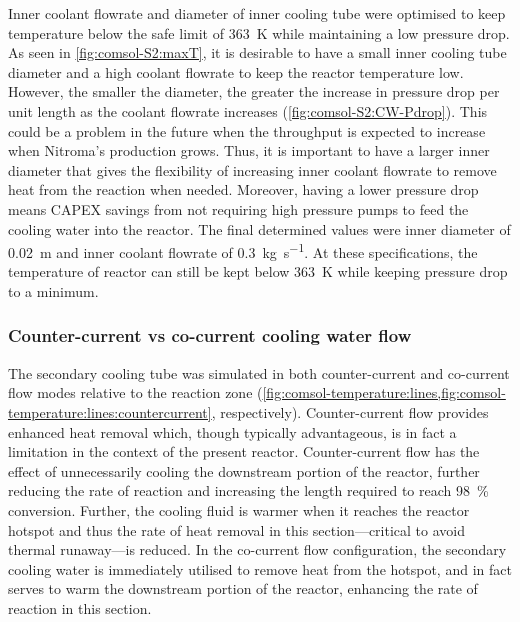 Inner coolant flowrate and diameter of inner cooling tube were optimised to keep temperature below the safe limit of \SI{363}{\K} while maintaining a low pressure drop. As seen in \cref{fig:comsol-S2:maxT}, it is desirable to have a small inner cooling tube diameter and a high coolant flowrate to keep the reactor temperature low. However, the smaller the diameter, the greater the increase in pressure drop per unit length as the coolant flowrate increases (\cref{fig:comsol-S2:CW-Pdrop}). This could be a problem in the future when the throughput is expected to increase when Nitroma's production grows. Thus, it is important to have a larger inner diameter that gives the flexibility of increasing inner coolant flowrate to remove heat from the reaction when needed. Moreover, having a lower pressure drop means CAPEX savings from not requiring high pressure pumps to feed the cooling water into the reactor. The final determined values were inner diameter of \SI{0.02}{\m} and inner coolant flowrate of \SI{0.3}{\kg\per\s}. At these specifications, the temperature of reactor can still be kept below \SI{363}{\K} while keeping pressure drop to a minimum.

\subsubsection{Counter-current vs co-current cooling water flow}
The secondary cooling tube was simulated in both counter-current and co-current flow modes relative to the reaction zone (\cref{fig:comsol-temperature:lines,fig:comsol-temperature:lines:countercurrent}, respectively). Counter-current flow provides enhanced heat removal which, though typically advantageous, is in fact a limitation in the context of the present reactor. Counter-current flow has the effect of unnecessarily cooling the downstream portion of the reactor, further reducing the rate of reaction and increasing the length required to reach \SI{98}{\percent} conversion. Further, the cooling fluid is warmer when it reaches the reactor hotspot and thus the rate of heat removal in this section---critical to avoid thermal runaway---is reduced. In the co-current flow configuration, the secondary cooling water is immediately utilised to remove heat from the hotspot, and in fact serves to warm the downstream portion of the reactor, enhancing the rate of reaction in this section.

